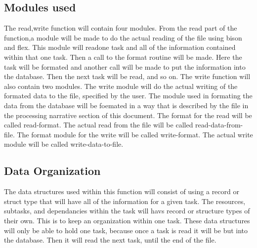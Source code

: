%
        \subsection{Modules used}
        The read,write function will contain four modules. From the read part of
the function,a module will be made to do the actual reading of the file using
bison and flex. This module will readone task and all of the information
contained within that one task. Then a call to the format routine will be made.
Here the task will be formated and another call will be made to put the
information into the database. Then the next task will be read, and so on.
The write function will also contain two modules. The write module will do the
actual writing of the formated data to the file, specified by the user. The
module used in formating the data from the database will be foemated in a way
that is described by the file in the processing narrative section of this
document. The format for the read will be called read-format. The
actual read from the file will be called read-data-from-file. The format module
for the write will be called write-format. The actual write module will be
called write-data-to-file.




        \subsection{Data Organization}
         The data structures used within this function will consist of using a
record or struct type that will have all of the information for a given task.
The resources, subtasks, and dependancies within the task will havs record or
structure types of their own. This is to keep an organization within one task.
These data structures will only be able to hold one task, because once a task is
read it will be but into the database. Then it will read the next task, until
the end of the file.

